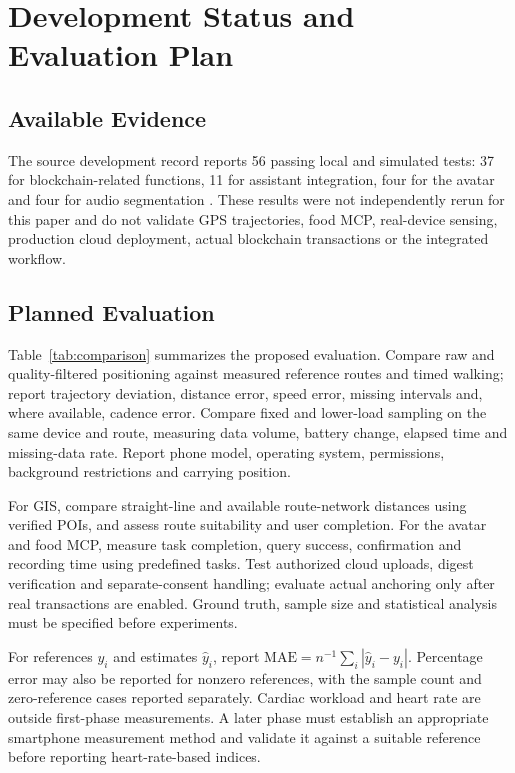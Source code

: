 \section{Development Status and Evaluation Plan}\label{sec:experiments}
\subsection{Available Evidence}
The source development record reports 56 passing local and simulated tests: 37 for blockchain-related functions, 11 for assistant integration, four for the avatar and four for audio segmentation \cite{blockchain}. These results were not independently rerun for this paper and do not validate GPS trajectories, food MCP, real-device sensing, production cloud deployment, actual blockchain transactions or the integrated workflow.

\subsection{Planned Evaluation}
Table~\ref{tab:comparison} summarizes the proposed evaluation. Compare raw and quality-filtered positioning against measured reference routes and timed walking; report trajectory deviation, distance error, speed error, missing intervals and, where available, cadence error. Compare fixed and lower-load sampling on the same device and route, measuring data volume, battery change, elapsed time and missing-data rate. Report phone model, operating system, permissions, background restrictions and carrying position.

For GIS, compare straight-line and available route-network distances using verified POIs, and assess route suitability and user completion. For the avatar and food MCP, measure task completion, query success, confirmation and recording time using predefined tasks. Test authorized cloud uploads, digest verification and separate-consent handling; evaluate actual anchoring only after real transactions are enabled. Ground truth, sample size and statistical analysis must be specified before experiments.


For references $y_i$ and estimates $\hat y_i$, report $\mathrm{MAE}=n^{-1}\sum_i |\hat y_i-y_i|$. Percentage error may also be reported for nonzero references, with the sample count and zero-reference cases reported separately. Cardiac workload and heart rate are outside first-phase measurements. A later phase must establish an appropriate smartphone measurement method and validate it against a suitable reference before reporting heart-rate-based indices.
